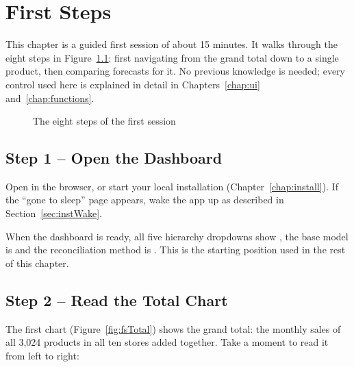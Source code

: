 %
%
%


\chapter{First Steps}
\label{chap:firstSteps}

This chapter is a guided first session of about 15 minutes. It walks through the eight steps in Figure~\ref{fig:firstSteps}: first navigating from the grand total down to a single product, then comparing forecasts for it. No previous knowledge is needed; every control used here is explained in detail in Chapters~\ref{chap:ui} and~\ref{chap:functions}.

\begin{figure}[H]
  \centering
  \resizebox{\linewidth}{!}{}
  \caption{The eight steps of the first session}
  \label{fig:firstSteps}
\end{figure}

\section{Step 1 -- Open the Dashboard}
\label{sec:fsOpen}

Open \AppLink{} in the browser, or start your local installation (Chapter~\ref{chap:install}). If the ``gone to sleep'' page appears, wake the app up as described in Section~\ref{sec:instWake}.

When the dashboard is ready, all five hierarchy dropdowns show , the base model is  and the reconciliation method is . This is the starting position used in the rest of this chapter.

\section{Step 2 -- Read the Total Chart}
\label{sec:fsTotal}

The first chart (Figure~\ref{fig:fsTotal}) shows the grand total: the monthly sales of all 3,024 products in all ten stores added together. Take a moment to read it from left to right:

